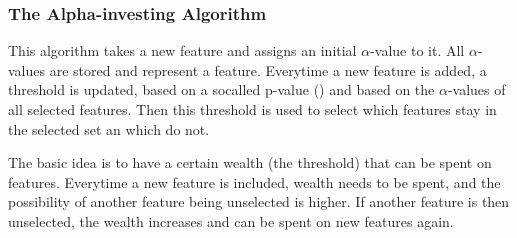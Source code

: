 \subsubsection{The Alpha-investing Algorithm}
\label{sec:methods.streaming.alpha_investing}


This algorithm takes a new feature and assigns an initial $\alpha$-value to it.
All $\alpha$-values are stored and represent a feature. Everytime a new feature is
added, a threshold is updated, based on a socalled p-value
(\cite{zhou2005learning}) and based on the $\alpha$-values of all selected
features. Then this threshold is used to select which features stay in the
selected set an which do not.

The basic idea is to have a certain wealth (the threshold) that can be spent on
features. Everytime a new feature is included, wealth needs to be spent, and the
possibility of another feature being unselected is higher. If another feature is
then unselected, the wealth increases and can be spent on new features again.
